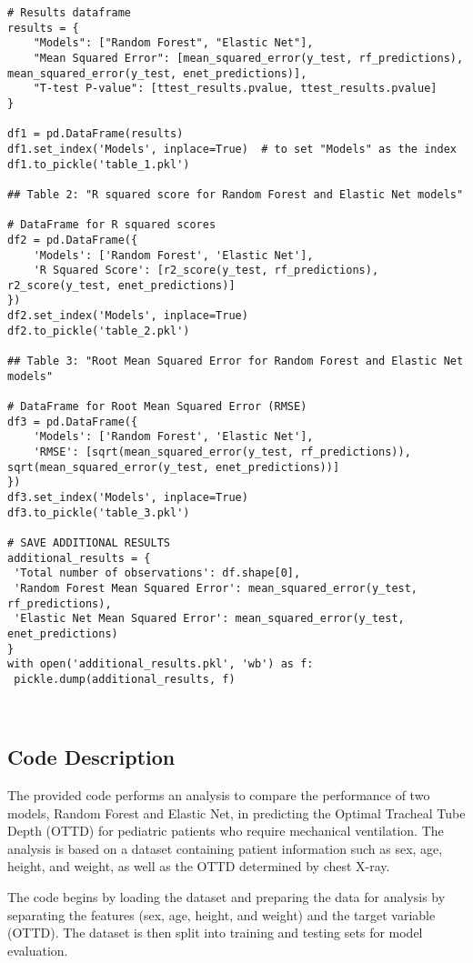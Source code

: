 \documentclass[11pt]{article}
\begin{document}
\begin{verbatim}
# Results dataframe
results = {
    "Models": ["Random Forest", "Elastic Net"],
    "Mean Squared Error": [mean_squared_error(y_test, rf_predictions), mean_squared_error(y_test, enet_predictions)],
    "T-test P-value": [ttest_results.pvalue, ttest_results.pvalue]
}

df1 = pd.DataFrame(results)
df1.set_index('Models', inplace=True)  # to set "Models" as the index
df1.to_pickle('table_1.pkl')

## Table 2: "R squared score for Random Forest and Elastic Net models"

# DataFrame for R squared scores
df2 = pd.DataFrame({
    'Models': ['Random Forest', 'Elastic Net'],
    'R Squared Score': [r2_score(y_test, rf_predictions), r2_score(y_test, enet_predictions)]
})
df2.set_index('Models', inplace=True)
df2.to_pickle('table_2.pkl')

## Table 3: "Root Mean Squared Error for Random Forest and Elastic Net models"

# DataFrame for Root Mean Squared Error (RMSE)
df3 = pd.DataFrame({
    'Models': ['Random Forest', 'Elastic Net'],
    'RMSE': [sqrt(mean_squared_error(y_test, rf_predictions)), sqrt(mean_squared_error(y_test, enet_predictions))]
})
df3.set_index('Models', inplace=True)
df3.to_pickle('table_3.pkl')

# SAVE ADDITIONAL RESULTS
additional_results = {
 'Total number of observations': df.shape[0], 
 'Random Forest Mean Squared Error': mean_squared_error(y_test, rf_predictions),
 'Elastic Net Mean Squared Error': mean_squared_error(y_test, enet_predictions)
}
with open('additional_results.pkl', 'wb') as f:
 pickle.dump(additional_results, f)
 
 
\end{verbatim}

\subsection{Code Description}

The provided code performs an analysis to compare the performance of two models, Random Forest and Elastic Net, in predicting the Optimal Tracheal Tube Depth (OTTD) for pediatric patients who require mechanical ventilation. The analysis is based on a dataset containing patient information such as sex, age, height, and weight, as well as the OTTD determined by chest X-ray.

The code begins by loading the dataset and preparing the data for analysis by separating the features (sex, age, height, and weight) and the target variable (OTTD). The dataset is then split into training and testing sets for model evaluation.
\end{document}
